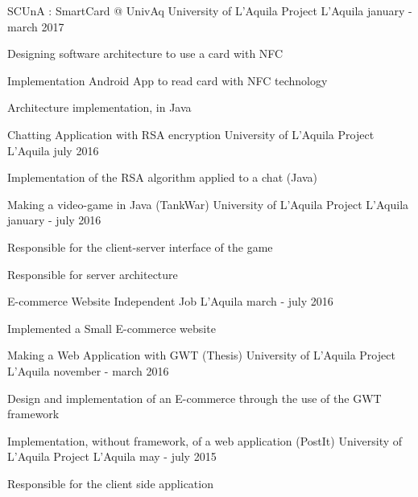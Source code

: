 \begin{cventries}
\cventry
{SCUnA : SmartCard @ UnivAq} %
{University of L'Aquila Project} %
{L'Aquila} %
{january - march 2017} %
{ %
	\begin{cvitems}
		\item {Designing software architecture to use a card with NFC}
		\item {Implementation Android App to read card with NFC technology}
		\item {Architecture implementation, in Java}
	\end{cvitems}
}
\cventry
{Chatting Application with RSA encryption} %
{University of L'Aquila Project} %
{L'Aquila} %
{july 2016} %
{ %
	\begin{cvitems}
		\item {Implementation of the RSA algorithm applied to a chat (Java)}
	\end{cvitems}
}

\cventry
{Making a video-game in Java (TankWar)} %
{University of L'Aquila Project} %
{L'Aquila} %
{january - july 2016} %
{ %
	\begin{cvitems}
		\item {Responsible for the client-server interface of the game}
		\item {Responsible for server architecture}
	\end{cvitems}
}

\cventry
{E-commerce Website} %
{Independent Job } %
{L'Aquila} %
{march - july 2016} %
{ %
\begin{cvitems}
\item {Implemented a Small E-commerce website}
\end{cvitems}
}

\cventry
{Making a Web Application with GWT (Thesis)} %
{University of L'Aquila Project} %
{L'Aquila} %
{november - march 2016} %
{ %
	\begin{cvitems}
		\item {Design and implementation of an E-commerce through the use of the GWT framework}
	\end{cvitems}
}

\cventry
{Implementation, without framework, of a web application (PostIt)} %
{University of L'Aquila Project} %
{L'Aquila} %
{may - july 2015} %
{ %
	\begin{cvitems}
		\item {Responsible for the client side application}
	\end{cvitems}
}

\end{cventries}